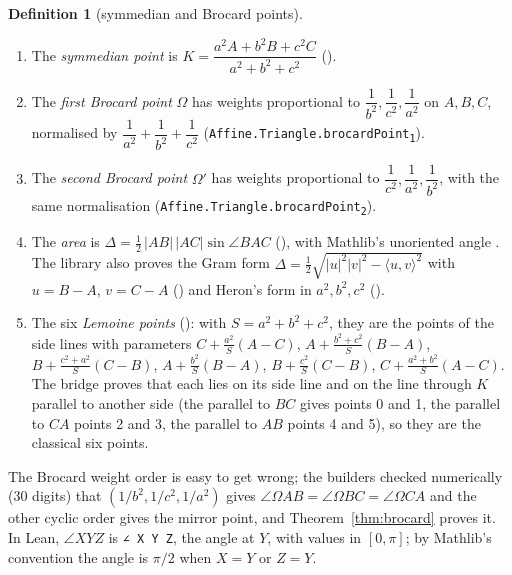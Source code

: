\documentclass[11pt]{article}
\theoremstyle{definition}
\newtheorem{definition}{Definition}
\theoremstyle{remark}
\newcommand{\lean}[1]{\texttt{#1}}
\begin{document}
\begin{definition}[symmedian and Brocard points]\label{def:brocard}
\begin{enumerate}
\item The \emph{symmedian point} is $K=\dfrac{a^2A+b^2B+c^2C}{a^2+b^2+c^2}$
().
\item The \emph{first Brocard point} $\Omega$ has weights proportional to
$\dfrac1{b^2},\dfrac1{c^2},\dfrac1{a^2}$ on $A,B,C$, normalised by
$\dfrac1{a^2}+\dfrac1{b^2}+\dfrac1{c^2}$ (\texttt{Affine.Triangle.brocardPoint\textsubscript{1}}).
\item The \emph{second Brocard point} $\Omega'$ has weights proportional to
$\dfrac1{c^2},\dfrac1{a^2},\dfrac1{b^2}$, with the same normalisation
(\texttt{Affine.Triangle.brocardPoint\textsubscript{2}}).
\item The \emph{area} is $\Delta=\tfrac12\,|AB|\,|AC|\sin\angle BAC$ (),
with Mathlib's unoriented angle . The library also proves the Gram
form $\Delta=\tfrac12\sqrt{|u|^2|v|^2-\langle u,v\rangle^2}$ with $u=B-A$, $v=C-A$
() and Heron's form in $a^2,b^2,c^2$ ().
\item The six \emph{Lemoine points} (): with
$S=a^2+b^2+c^2$, they are the points of the side lines with parameters
$C+\tfrac{a^2}{S}(A-C)$, $A+\tfrac{b^2+c^2}{S}(B-A)$, $B+\tfrac{c^2+a^2}{S}(C-B)$,
$A+\tfrac{b^2}{S}(B-A)$, $B+\tfrac{c^2}{S}(C-B)$, $C+\tfrac{a^2+b^2}{S}(A-C)$. The bridge
 proves that each lies on its side line and on the line through $K$
parallel to another side (the parallel to $BC$ gives points 0 and 1, the parallel to $CA$ points 2
and 3, the parallel to $AB$ points 4 and 5), so they are the classical six points.
\end{enumerate}
\end{definition}

The Brocard weight order is easy to get wrong; the builders checked numerically (30 digits) that
$(1/b^2,1/c^2,1/a^2)$ gives $\angle\Omega AB=\angle\Omega BC=\angle\Omega CA$ and the other cyclic
order gives the mirror point, and Theorem~\ref{thm:brocard} proves it. In Lean, $\angle XYZ$ is
\lean{∠ X Y Z}, the angle at $Y$, with values in $[0,\pi]$; by Mathlib's convention the angle is
$\pi/2$ when $X=Y$ or $Z=Y$.
\end{document}
